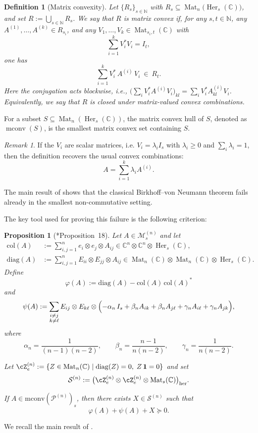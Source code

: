 \documentclass[11pt, a4paper]{article}
\theoremstyle{plain}
\newtheorem{proposition}[theorem]{Proposition}
\newtheorem{definition}[theorem]{Definition}
\theoremstyle{definition}
\theoremstyle{remark}
\newtheorem{remark}[theorem]{Remark}
\newcommand{\N}{\mathbb{N}}
\newcommand{\C}{\mathbb{C}}
\newcommand{\cM}{\mathcal{M}} \newcommand{\cN}{\mathcal{N}} \newcommand{\cO}{\mathcal{O}}
\newcommand{\cP}{\mathcal{P}} \newcommand{\cQ}{\mathcal{Q}} \newcommand{\cR}{\mathcal{R}}
\newcommand{\Her}[2][\C]{\operatorname{Her}_{#2}(#1)}
\newcommand{\Mat}[2]{\operatorname{Mat}_{#2}\!\left(#1\right)}
\begin{document}
\begin{definition}[Matrix convexity] 
Let \(\{R_s\}_{s\in\N}\) with \(R_s \subseteq \operatorname{Mat}_n\bigl(\Her{s}\bigr)\), and set \(R:=\bigcup_{s\in\N} R_s\). We say that \(R\) is matrix convex if, for any \(s,t\in\N\), any \(A^{(1)},\dots,A^{(k)}\in R_{s_i}\), and any \(V_1,\dots,V_k\in \operatorname{Mat}_{s_i,t}(\C)\) with \[ \sum_{i=1}^k V_i^* V_i = I_t, \] one has \[ \sum_{i=1}^k V_i^*\, A^{(i)} \, V_i \ \in\ R_t. \] Here the conjugation acts blockwise, i.e., \(\bigl(\sum_i V_i^* A^{(i)} V_i\bigr)_{kl} = \sum_i V_i^* A^{(i)}_{kl} V_i\). Equivalently, we say that \(R\) is closed under matrix-valued convex combinations. 
\end{definition} 

For a subset \(S\subseteq \operatorname{Mat}_n(\Her{s})\), the matrix convex hull of \(S\), denoted as \(\operatorname{mconv}(S)\), is the smallest matrix convex set containing \(S\). 
\begin{remark}
If the  \(V_i\) are scalar matrices, i.e. \(V_i = \lambda_i I_s\) with \(\lambda_i\ge0\) and \(\sum_i \lambda_i = 1\), then the definition recovers the usual convex combinations:
\[
A = \sum_{i=1}^k \lambda_i A^{(i)}.
\]
\end{remark}
The main result of \cite{DDN20} shows that the classical
Birkhoff--von Neumann theorem fails already in the smallest
non-commutative setting.

The key tool used for proving this failure is the following criterion:
\begin{proposition}[{\cite{DDN20}*{Proposition~18}}]\label{prop:DDN-separation}
Let \(A\in \cM^{(n)}_s\) and let
\[\begin{split}
    \mathrm{col}(A) &:= \sum_{i,j=1}^n e_i\otimes e_j \otimes A_{ij} \in \C^n\otimes\C^n\otimes \Her[\C]{s}, \\
\mathrm{diag}(A) &:= \sum_{i,j=1}^n E_{ii}\otimes E_{jj}\otimes A_{ij}\in \Mat{\C}{n}\otimes \Mat{\C}{n}\otimes \Her{s}.
\end{split}\]
Define
\[
\varphi(A) := \mathrm{diag}(A) - \mathrm{col}(A)\,\mathrm{col}(A)^*
\]
and
\[
\psi(A) := \sum_{\substack{i\neq j \\ k\neq \ell}}
E_{ij}\otimes E_{k\ell} \otimes 
\Bigl(-\alpha_n\,I_s + \beta_n A_{ik} + \beta_n A_{j\ell} + \gamma_n A_{i\ell} +\gamma_n A_{jk}\Bigr),
\]
where
\[
\alpha_n = \frac{1}{(n-1)(n-2)},\qquad
\beta_n = \frac{n-1}{n(n-2)},\qquad
\gamma_n = \frac{1}{n(n-2)}.
\]

Let \(\cZ_e^{(n)} := \{Z\in \operatorname{Mat}_n(\C)\mid \mathrm{diag}(Z)=0,\; Z\,\mathbf{1}=0\}\) and set
\[
\mathcal{S}^{(n)} := \bigl(\cZ_e^{(n)}\otimes \cZ_e^{(n)} \otimes \operatorname{Mat}_s(\C)\bigr)_{\mathrm{her}}.
\]

If \(A \in \mathrm{mconv}(\cP^{(n)})_s\), then there exists 
\(X \in \mathcal{S}^{(n)}\) such that
\[
\varphi(A) + \psi(A) + X \succeq 0.
\]
\end{proposition}
We recall the main result of \cite{DDN20}.
\end{document}
